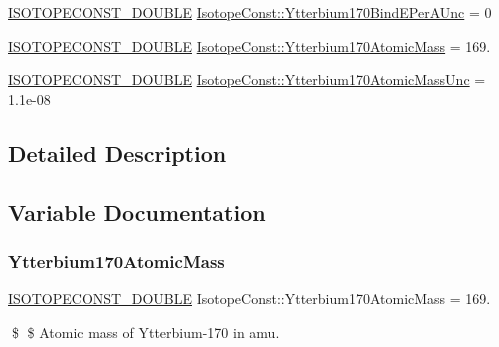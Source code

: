 \begin{DoxyCompactItemize}
\mbox{\hyperlink{group___isotope_const-_macros_ga8f45a7272ce02c0b4c65c44636ed719a}{I\+S\+O\+T\+O\+P\+E\+C\+O\+N\+S\+T\+\_\+\+D\+O\+U\+B\+LE}} \mbox{\hyperlink{group___isotope_const-_ytterbium-_yb170_ga22f5b88e37b704ec47f4d8b84aa3894c}{Isotope\+Const\+::\+Ytterbium170\+Bind\+E\+Per\+A\+Unc}} = 0
\item 
\mbox{\hyperlink{group___isotope_const-_macros_ga8f45a7272ce02c0b4c65c44636ed719a}{I\+S\+O\+T\+O\+P\+E\+C\+O\+N\+S\+T\+\_\+\+D\+O\+U\+B\+LE}} \mbox{\hyperlink{group___isotope_const-_ytterbium-_yb170_ga325af7fc045ebbc241288f538005a006}{Isotope\+Const\+::\+Ytterbium170\+Atomic\+Mass}} = 169.
\item 
\mbox{\hyperlink{group___isotope_const-_macros_ga8f45a7272ce02c0b4c65c44636ed719a}{I\+S\+O\+T\+O\+P\+E\+C\+O\+N\+S\+T\+\_\+\+D\+O\+U\+B\+LE}} \mbox{\hyperlink{group___isotope_const-_ytterbium-_yb170_gaa2e66e09fd7ca966cdbe76ed6fc24fed}{Isotope\+Const\+::\+Ytterbium170\+Atomic\+Mass\+Unc}} = 1.\+1e-\/08
\end{DoxyCompactItemize}


\subsection{Detailed Description}


\subsection{Variable Documentation}
\mbox{\label{group___isotope_const-_ytterbium-_yb170_ga325af7fc045ebbc241288f538005a006}} 
\subsubsection{\texorpdfstring{Ytterbium170\+Atomic\+Mass}{Ytterbium170AtomicMass}}
{\footnotesize\ttfamily \mbox{\hyperlink{group___isotope_const-_macros_ga8f45a7272ce02c0b4c65c44636ed719a}{I\+S\+O\+T\+O\+P\+E\+C\+O\+N\+S\+T\+\_\+\+D\+O\+U\+B\+LE}} Isotope\+Const\+::\+Ytterbium170\+Atomic\+Mass = 169.}

\$ \$ Atomic mass of Ytterbium-\/170 in amu. \mbox{\label{group___isotope_const-_ytterbium-_yb170_gaa2e66e09fd7ca966cdbe76ed6fc24fed}} 
